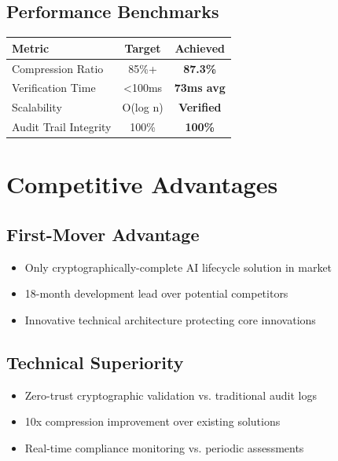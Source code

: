 \documentclass[12pt,a4paper]{article}
\begin{document}
\subsection{Performance Benchmarks}

\begin{center}
\begin{tabular}{lcc}
\toprule
\textbf{Metric} & \textbf{Target} & \textbf{Achieved} \\
\midrule
Compression Ratio & 85\%+ & \textcolor{success}{\textbf{87.3\%}} \\
Verification Time & <100ms & \textcolor{success}{\textbf{73ms avg}} \\
Scalability & O(log n) & \textcolor{success}{\textbf{Verified}} \\
Audit Trail Integrity & 100\% & \textcolor{success}{\textbf{100\%}} \\
\bottomrule
\end{tabular}
\end{center}

\section{Competitive Advantages}

\subsection{First-Mover Advantage}
\begin{itemize}
    \item Only cryptographically-complete AI lifecycle solution in market
    \item 18-month development lead over potential competitors
    \item Innovative technical architecture protecting core innovations
\end{itemize}

\subsection{Technical Superiority}
\begin{itemize}
    \item Zero-trust cryptographic validation vs. traditional audit logs
    \item 10x compression improvement over existing solutions
    \item Real-time compliance monitoring vs. periodic assessments
\end{itemize}
\end{document}
